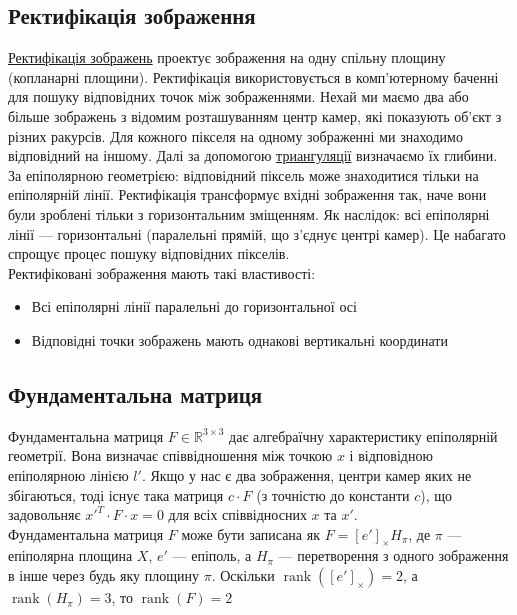 \subsection{Ректифікація зображення}
\href{https://en.wikipedia.org/wiki/Image_rectification}{Ректифікація зображень} 
проектує зображення на одну спільну площину (копланарні площини). Ректифікація 
використовується в комп'ютерному баченні для пошуку відповідних точок між 
зображеннями. Нехай ми маємо два або більше зображень з відомим розташуванням 
центр камер, які показують об'єкт з різних ракурсів. Для кожного пікселя на 
одному зображенні ми знаходимо відповідний на іншому. Далі за допомогою 
\href{https://en.wikipedia.org/wiki/Triangulation_(computer_vision)}
{триангуляції} визначаємо їх глибини. 
\\
\indent
За епіполярною геометрією: відповідний піксель може знаходитися тільки на 
епіполярній лінії. Ректифікація трансформує вхідні зображення так, наче вони 
були зроблені тільки з горизонтальним зміщенням. Як наслідок: всі епіполярні 
лінії --- горизонтальні (паралельні прямій, що з'єднує центрі камер). Це 
набагато спрощує процес пошуку відповідних пікселів. 
\\
\indent
Ректифіковані зображення мають такі властивості:
\begin{itemize}
 \item{Всі епіполярні лінії паралельні до горизонтальної осі}
 \item{Відповідні точки зображень мають однакові вертикальні координати}
\end{itemize}

\subsection{Фундаментальна матриця}
Фундаментальна матриця $F \in \mathbb{R}^{3\times3}$ дає алгебраїчну 
характеристику епіполярній геометрії. Вона визначає співвідношення між точкою 
$x$ і відповідною епіполярною лінією $l'$. Якщо у нас є два зображення, центри 
камер яких не збігаються, тоді існує така матриця $c \cdot F$ (з точністю до
константи $c$), що задовольняє ${x'}^T \cdot F \cdot x = 0$ для всіх 
співвідносних $x$ та $x'$.
\\\indent
Фундаментальна матриця $F$ може бути записана як $F = {[e']}_\times H_\pi$, де 
$\pi$ --- епіполярна площина $X$, $e'$ --- епіполь, а $H_\pi$ --- перетворення з
одного зображення в інше через будь яку площину $\pi$. Оскільки 
$\operatorname{rank}({[e']}_\times) = 2$, а $\operatorname{rank}(H_\pi) = 3$,
то $\operatorname{rank}(F) = 2$ 

